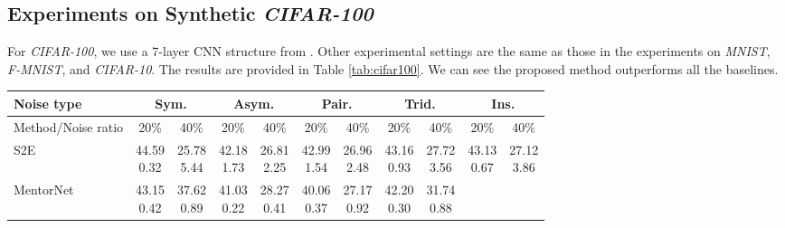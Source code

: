 \documentclass[11pt]{article}
\begin{document}
\subsection{Experiments on Synthetic \textit{CIFAR-100}}
For \textit{CIFAR-100}, we use a 7-layer CNN structure from \cite{yu2019does,yao2020searching}. Other experimental settings are the same as those in the experiments on \textit{MNIST}, \textit{F-MNIST}, and \textit{CIFAR-10}. The results are provided in Table \ref{tab:cifar100}. We can see the proposed method outperforms all the baselines.
\begin{table}[!htbp]
    \small
\centering
	\begin{tabular}{l |cc|cc|cc|cc|cc} 
		\Xhline{3\arrayrulewidth}	 	
		   Noise type &\multicolumn{2}{c|}{Sym.}&\multicolumn{2}{c|}{Asym.}&\multicolumn{2}{c|}{Pair.}&\multicolumn{2}{c|}{Trid.}&\multicolumn{2}{c}{Ins.}\\
			\hline
		   Method/Noise ratio&  20\% & 40\%& 20\% & 40\% &20\% & 40\%& 20\% & 40\% & 20\% & 40\%\\
			\hline
			S2E & \makecell{44.59\\ \scriptsize{0.32}}
			& \makecell{25.78\\ \scriptsize{5.44}}
			& \makecell{42.18\\ \scriptsize{1.73}}
			& \makecell{26.81\\ \scriptsize{2.25}}
			& \makecell{42.99\\ \scriptsize{1.54}}
			& \makecell{26.96\\ \scriptsize{2.48}}
			& \makecell{43.16\\ \scriptsize{0.93}}
			& \makecell{27.72\\ \scriptsize{3.56}}
			& \makecell{43.13\\ \scriptsize{0.67}}
			& \makecell{27.12\\ \scriptsize{3.86}}\\
			\hline
			MentorNet & \makecell{43.15\\ \scriptsize{0.42}}
			& \makecell{37.62\\ \scriptsize{0.89}}
			& \makecell{41.03\\ \scriptsize{0.22}}
			& \makecell{28.27\\ \scriptsize{0.41}}
			& \makecell{40.06\\ \scriptsize{0.37}}
			& \makecell{27.17\\ \scriptsize{0.92}}
			& \makecell{42.20\\ \scriptsize{0.30}}
			& \makecell{31.74\\ \scriptsize{0.88}}

\end{tabular}
\end{table}
\end{document}
